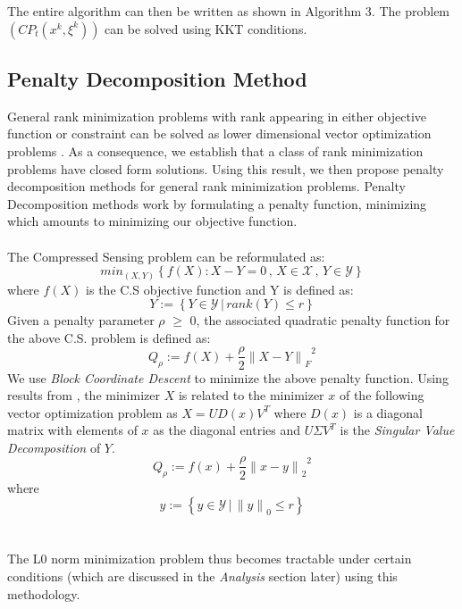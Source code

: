 \documentclass[letterpaper, 10 pt, conference]{article}
\begin{document}
The entire algorithm can then be written as shown in Algorithm 3.
The problem $(CP_t(x^k, \xi^k))$ can be solved using KKT conditions.

\subsection{Penalty Decomposition Method}
General rank minimization problems with rank appearing
in either objective function or constraint can be solved as lower dimensional vector optimization problems \cite{pd}. As a consequence, we establish that a class of rank minimization problems have closed form solutions. Using this result, we then propose penalty decomposition methods for general rank minimization problems. Penalty Decomposition methods work by formulating a penalty function, minimizing which amounts to minimizing our objective function.
\\ \\
\newpage
\noindent The Compressed Sensing problem can be reformulated as:
$$min_{(X,Y)}\left\{{f(X) : X-Y=0\,,\, X \in \mathcal{X}\,,\, Y \in \mathcal{Y}}\right\}$$
where $f(X)$ is the C.S objective function and Y is defined as:
$$Y:=\left\{{Y \in \mathcal{Y}\,  |\,  rank(Y) \le r}\right\}$$
Given a penalty parameter $\rho$ $\ge$ 0, the associated quadratic penalty function for the above C.S. problem is defined as:
$$Q_{\rho} := {f(X)+\frac{\rho}{2} {{\|X-Y \|}_F}^2}$$
We use \emph{Block Coordinate Descent} to minimize the above penalty function. Using results from \cite{pd}, the minimizer $X$ is related to the minimizer $x$ of the following vector optimization problem as $X=UD(x){V}^T$ where $D(x)$ is a diagonal matrix with elements of $x$ as the diagonal entries and $U\Sigma V^T$ is the \emph{Singular Value Decomposition} of $Y$.
$$Q_{\rho} := {f(x)+\frac{\rho}{2} {{\|x-y \|}_2}^2}$$
where $$y:=\left\{{y \in \mathcal{Y}\, |\, {\|y\|}_0 \le r}\right\}$$
\\ \\
The L0 norm minimization problem thus becomes tractable under certain conditions (which are discussed in the \emph{Analysis} section later) using this methodology.
\end{document}
